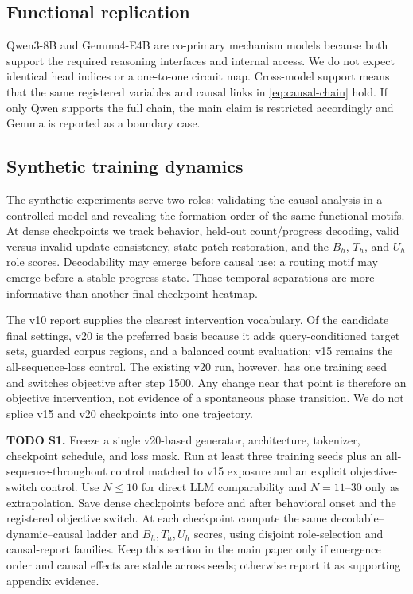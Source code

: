 \documentclass[10pt,twocolumn]{article}
\newcommand{\todoid}[2]{%
  \par\noindent\textcolor{red!75!black}{\textbf{TODO #1.} #2}\par}
\begin{document}
\subsection{Functional replication}
Qwen3-8B and Gemma4-E4B are co-primary mechanism models because both support the required
reasoning interfaces and internal access. We do not expect identical head indices or a
one-to-one circuit map. Cross-model support means that the same registered variables and causal
links in \cref{eq:causal-chain} hold. If only Qwen supports the full chain, the main claim is
restricted accordingly and Gemma is reported as a boundary case.

\subsection{Synthetic training dynamics}
The synthetic experiments serve two roles: validating the causal analysis in a controlled model
and revealing the formation order of the same functional motifs. At dense checkpoints we track
behavior, held-out count/progress decoding, valid versus invalid update consistency, state-patch
restoration, and the $B_h$, $T_h$, and $U_h$ role scores. Decodability may emerge before causal
use; a routing motif may emerge before a stable progress state. Those temporal separations are
more informative than another final-checkpoint heatmap.

The v10 report supplies the clearest intervention vocabulary. Of the candidate final settings,
v20 is the preferred basis because it adds query-conditioned target sets, guarded corpus regions,
and a balanced count evaluation; v15 remains the all-sequence-loss control. The existing v20 run,
however, has one training seed and switches objective after step 1500. Any change near that point
is therefore an objective intervention, not evidence of a spontaneous phase transition. We do
not splice v15 and v20 checkpoints into one trajectory.

\todoid{S1}{Freeze a single v20-based generator, architecture, tokenizer, checkpoint schedule,
and loss mask. Run at least three training seeds plus an all-sequence-throughout control matched
to v15 exposure and an explicit objective-switch control. Use $N\leq10$ for direct LLM
comparability and $N=11$--30 only as extrapolation. Save dense checkpoints before and after
behavioral onset and the registered objective switch. At each checkpoint compute the same
decodable--dynamic--causal ladder and $B_h,T_h,U_h$ scores, using disjoint role-selection and
causal-report families. Keep this section in the main paper only if emergence order and causal
effects are stable across seeds; otherwise report it as supporting appendix evidence.}
\end{document}
